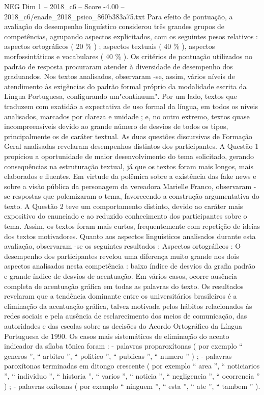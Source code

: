 \begin{textsample}{NEG Dim 1 – 2018\_c6 – Score -4.00 – 2018\_c6/enade\_2018\_psico\_860b383a75.txt}
Para efeito de pontuação, a avaliação do desempenho linguístico considerou três grandes grupos de competências, agrupando aspectos explicitados, com os seguintes pesos relativos : aspectos ortográficos ( 20 \% ) ; aspectos textuais ( 40 \% ), aspectos morfossintáticos e vocabulares ( 40 \% ).
Os critérios de pontuação utilizados no padrão de resposta procuraram atender à diversidade de desempenho dos graduandos.
Nos textos analisados, observaram -se, assim, vários níveis de atendimento às exigências do padrão formal próprio da modalidade escrita da Língua Portuguesa, configurando um"continuum".
Por um lado, textos que traduzem com exatidão a expectativa de uso formal da língua, em todos os níveis analisados, marcados por clareza e unidade ; e, no outro extremo, textos quase incompreensíveis devido ao grande número de desvios de todos os tipos, principalmente os de caráter textual.
As duas questões discursivas de Formação Geral analisadas revelaram desempenhos distintos dos participantes.
A Questão 1 propiciou a oportunidade de maior desenvolvimento do tema solicitado, gerando consequências na estruturação textual, já que os textos foram mais longos, mais elaborados e fluentes.
Em virtude da polêmica sobre a existência das fake news e sobre a visão pública da personagem da vereadora Marielle Franco, observaram -se respostas que polemizaram o tema, favorecendo a construção argumentativa do texto.
A Questão 2 teve um comportamento distinto, devido ao caráter mais expositivo do enunciado e ao reduzido conhecimento dos participantes sobre o tema.
Assim, os textos foram mais curtos, frequentemente com repetição de ideias dos textos motivadores.
Quanto aos aspectos linguísticos analisados durante esta avaliação, observaram -se os seguintes resultados : Aspectos ortográficos : O desempenho dos participantes revelou uma diferença muito grande nos dois aspectos analisados nesta competência : baixo índice de desvios da grafia padrão e grande índice de desvios de acentuação.
Em vários casos, ocorre ausência completa de acentuação gráfica em todas as palavras do texto.
Os resultados revelaram que a tendência dominante entre os universitários brasileiros é a eliminação da acentuação gráfica, talvez motivada pelos hábitos relacionados às redes sociais e pela ausência de esclarecimento dos meios de comunicação, das autoridades e das escolas sobre as decisões do Acordo Ortográfico da Língua Portuguesa de 1990.
Os casos mais sistemáticos de eliminação do acento indicador da sílaba tônica foram : - palavras proparoxítonas ( por exemplo “ generos ”, “ arbitro ”, “ politico ”, “ publicas ”, “ numero ” ) ; - palavras paroxítonas terminadas em ditongo crescente ( por exemplo “ area ”, “ noticiarios ”, “ individuo ”, “ historia ”, “ varios ”, “ noticia ”, “ negligencia ”, “ ocorrencia ” ) ; - palavras oxítonas ( por exemplo “ ninguem ”, “ esta ”, “ ate ”, “ tambem ” ).

\end{textsample}
